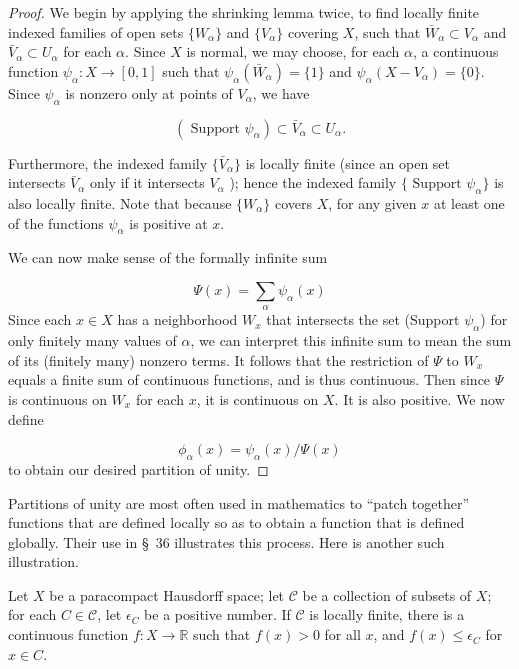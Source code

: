 \begin{proof}
We begin by applying the shrinking lemma twice, to find locally finite indexed families of open sets \(\{ W_{\alpha }\}\) and \(\{ V_{\alpha }\}\) covering \(X\), such that \(\bar{W}_{\alpha } \subset {V}_{\alpha }\) and \(\bar{V}_{\alpha } \subset {U}_{\alpha }\) for each \(\alpha\). Since \(X\) is normal, we may choose, for each \(\alpha\), a continuous function \({\psi }_{\alpha } : X \rightarrow [{0,1}]\) such that \({\psi }_{\alpha }(\bar{W}_{\alpha }) = \{ 1\}\) and \({\psi }_{\alpha }({X - V_{\alpha }}) = \{ 0\}\). Since \({\psi }_{\alpha }\) is nonzero only at points of \(V_{\alpha }\), we have

\[
({\text{ Support }{\psi }_{\alpha }}) \subset {\bar{V}}_{\alpha } \subset {U}_{\alpha }\text{.}
\]

Furthermore, the indexed family \(\{ \bar{V}_{\alpha }\}\) is locally finite (since an open set intersects \(\bar{V}_{\alpha }\) only if it intersects \(V_{\alpha }\) ); hence the indexed family \(\{ {\text{ Support }{\psi }_{\alpha }}\}\) is also locally finite. Note that because \(\{ W_{\alpha }\}\) covers \(X\), for any given \(x\) at least one of the functions \({\psi }_{\alpha }\) is positive at \(x\).

We can now make sense of the formally infinite sum

\[
\Psi (x) = \mathop{\sum }\limits_{\alpha }{\psi }_{\alpha }(x)
\]
Since each \(x \in X\) has a neighborhood \(W_{x}\) that intersects the set (Support \({\psi }_{\alpha }\)) for only finitely many values of \(\alpha\), we can interpret this infinite sum to mean the sum of its (finitely many) nonzero terms. It follows that the restriction of \(\Psi\) to \(W_{x}\) equals a finite sum of continuous functions, and is thus continuous. Then since \(\Psi\) is continuous on \(W_{x}\) for each \(x\), it is continuous on \(X\). It is also positive. We now define

\[
{\phi }_{\alpha }(x) = {\psi }_{\alpha }(x) /\Psi (x)
\]
to obtain our desired partition of unity.
\end{proof}

Partitions of unity are most often used in mathematics to ``patch together'' functions that are defined locally so as to obtain a function that is defined globally. Their use in \S\ 36 illustrates this process. Here is another such illustration.

\begin{theorem}
\label{thm:\thetheorem}
Let \(X\) be a paracompact Hausdorff space; let \(\mathcal{C}\) be a collection of subsets of \(X\); for each \(C \in \mathcal{C}\), let \({\epsilon }_{C}\) be a positive number. If \(\mathcal{C}\) is locally finite, there is a continuous function \(f : X \rightarrow \mathbb{R}\) such that \(f(x) > 0\) for all \(x\), and \(f(x) \leq {\epsilon }_{C}\) for \(x \in C\).
\end{theorem}

